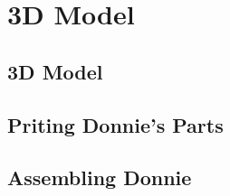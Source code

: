 \chapter{3D Model}

\section{3D Model}
\label{sec:3d_model}

\section{Priting Donnie's Parts}
\label{sec:3d_print}


\section{Assembling Donnie}
\label{sec:3d_asm}

